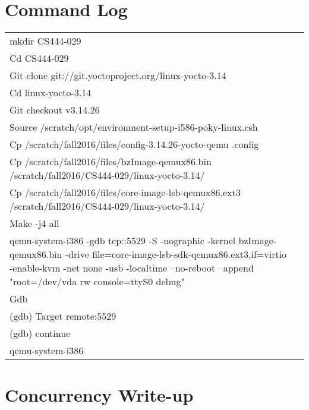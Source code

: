 \documentclass[letterpaper,10pt]{article}
\begin{document}
	\section{Command Log}
		\setcounter{rowcount}{0}
		\begin{tabular}{@{\stepcounter{rowcount}\therowcount.)\hspace*{\tabcolsep}}ll}
			mkdir CS444-029 \\
			
			Cd CS444-029 \\
			
			Git clone git://git.yoctoproject.org/linux-yocto-3.14 \\
			
			Cd linux-yocto-3.14	\\		
			
			Git checkout v3.14.26 \\	
			
			Source /scratch/opt/environment-setup-i586-poky-linux.csh \\	
					
			Cp /scratch/fall2016/files/config-3.14.26-yocto-qemu .config \\
			
			Cp /scratch/fall2016/files/bzImage-qemux86.bin /scratch/fall2016/CS444-029/linux-yocto-3.14/ \\
			
			Cp /scratch/fall2016/files/core-image-lsb-qemux86.ext3 /scratch/fall2016/CS444-029/linux-yocto-3.14/ \\
			
			Make -j4 all \\
			
			qemu-system-i386 -gdb tcp::5529 -S -nographic -kernel bzImage-qemux86.bin -drive file=core-image-lsb-sdk-qemux86.ext3,if=virtio -enable-kvm -net none -usb -localtime --no-reboot --append "root=/dev/vda rw console=ttyS0 debug" \\
			
			Gdb \\
			
			(gdb) Target remote:5529 \\
			
			(gdb) continue \\
			qemu-system-i386  \\
			
		\end{tabular}

	\clearpage
	\section{Concurrency Write-up}
	
\end{document}
